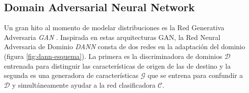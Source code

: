 \subsection{Domain Adversarial Neural Network}
Un gran hito al momento de modelar distribuciones es la Red Generativa Adversaria {\it GAN} \parencite{goodfellow2020generative}. Inspirada en estas arquitecturas GAN, la Red Neural Adversaria de Dominio {\it DANN} \parencite{ganin2016domain} consta de dos redes en la adaptación del dominio (figura \ref{fig:dann-esquema}). La primera es
la discriminadora de dominios $\mathcal{D}$ entrenada para distinguir las características de origen de las de destino y
la segunda es una generadora de características $\mathcal{G}$ que se entrena para confundir a $\mathcal{D}$ y
simult\'aneamente ayudar a la red clasificadora $\mathcal{C}$.

